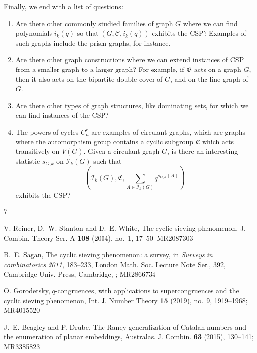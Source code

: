 \documentclass[12pt]{article}
\theoremstyle{definition}
\begin{document}
Finally, we end with a list of questions:
\begin{enumerate}
\item Are there other commonly studied families of graph $G$ where we can find polynomials $i_k(q)$ so that $(G, \mathcal{C}, i_k(q))$ exhibits the CSP? Examples of such graphs include the prism graphs, for instance.
\item Are there other graph constructions where we can extend instances of CSP from a smaller graph to a larger graph? For example, if $\mathfrak{G}$ acts on a graph $G$, then it also acts on the bipartite double cover of $G$, and on the line graph of $G.$
\item Are there other types of graph structures, like dominating sets, for which we can find instances of the CSP?
\item The powers of cycles $C_n^r$ are examples of circulant graphs, which are graphs where the automorphism group contains a cyclic subgroup $\mathfrak{C}$ which acts transitively on $V(G)$. Given a circulant graph $G$, is there an interesting statistic $s_{G,k}$ on $\mathcal{I}_k(G)$ such that \[\left(\mathcal{I}_k(G), \mathfrak{C}, \sum\limits_{A \in \mathcal{I}_k(G)} q^{s_{G,k}(A)}\right)\]exhibits the CSP?
\end{enumerate}



\begin{thebibliography}{7}

 V. Reiner, D.~W. Stanton and D.~E. White, The cyclic sieving phenomenon, J. Combin. Theory Ser. A {\bf 108} (2004), no.~1, 17--50; MR2087303

 B.~E. Sagan, The cyclic sieving phenomenon: a survey, in {\it Surveys in combinatorics 2011}, 183--233, London Math. Soc. Lecture Note Ser., 392, Cambridge Univ. Press, Cambridge, ; MR2866734

 O. Gorodetsky, $q$-congruences, with applications to supercongruences and the cyclic sieving phenomenon, Int. J. Number Theory {\bf 15} (2019), no.~9, 1919--1968; MR4015520

 J.~E. Beagley and P. Drube, The Raney generalization of Catalan numbers and the enumeration of planar embeddings, Australas. J. Combin. {\bf 63} (2015), 130--141; MR3385823
              
\end{thebibliography}
\end{document}
